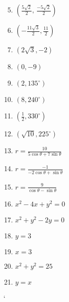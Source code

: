 \documentclass{article}
\begin{document}
\begin{minipage}{0.3\textwidth}
\begin{enumerate}[itemsep=0.5cm]
\setcounter{enumi}{4}
    \item $\left(\frac{5\sqrt{2}}{2}, \, \frac{-5\sqrt{2}}{2}\right)$
    \item $\left(-\frac{11\sqrt{3}}{2}, \frac{11}{2}\right)$
    \item $\left(2\sqrt{3}, -2\right)$
    \item $(0, -9)$
    \item $(2, 135^\circ)$
    \item $(8, 240^\circ)$
    \item $\left(\frac{1}{2}, 330^\circ\right)$
    \item $(\sqrt{10}, 225^\circ)$
    \item $r = \frac{10}{5\cos\theta + 7\sin\theta}$
    \item $r = \frac{-1}{-2\cos\theta + \sin\theta}$
    \item $r = \frac{9}{\cos\theta - \sin\theta}$
    \item $x^{2}-4x+y^{2}=0$
    \item $x^{2}+y^{2}-2y=0$
    \item $y = 3$
    \item $x = 3$
    \item $x^2 + y^2 = 25$
    \item $y = x$
\end{enumerate}`
\end{minipage}
\end{document}

